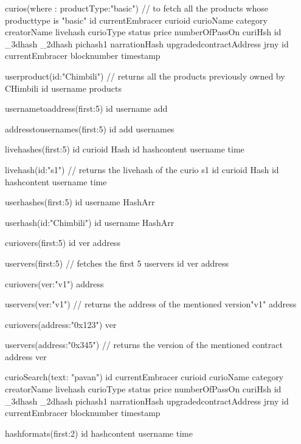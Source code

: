   curios(where : {productType:"basic"}){     // to fetch all the products whose producttype is "basic"
    id
  	currentEmbracer
  	curioid
  	curioName
  	category
  	creatorName
  	livehash
  	curioType
  	status
  	price
  	numberOfPassOn
  	curiHsh {
  	  id
	  _3dhash
	  _2dhash
	  pichash1
	  narrationHash
  	}
  	upgradedcontractAddress
  	jrny{
      id
	  currentEmbracer
	  blocknumber
	  timestamp
    }
  }
  
  userproduct(id:"Chimbili"){   // returns all the products previously owned by CHimbili
	id
	username
	products
  }
  
  usernametoaddress(first:5){
	id
	username
	add
  }
  
  addresstousernames(first:5){
	id
	add
	usernames
  }
  
  livehashes(first:5){  
	id
	curioid
	Hash {
	 id
	 hashcontent
	 username
	 time
	}
  }
  
  
  livehash(id:"s1"){   // returns the livehash of the curio s1
	id
	curioid
	Hash {
	 id
	 hashcontent
	 username
	 time
	}
  }
  
  
  userhashes(first:5){
	id
    username
    HashArr
  }
  
  userhash(id:"Chimbili"){
	id
    username
    HashArr
  }
  
  curiovers(first:5){  
   id
   ver
   address
  }
  
  uservers(first:5){  // fetches the first 5 uservers
   id
   ver
   address
  }
  
  curiovers(ver:"v1"){  
   address
  }
  
  uservers(ver:"v1"){  // returns the address of the mentioned version"v1"
   address
  }
  
  curiovers(address:"0x123"){  
   ver
  }
  
  uservers(address:"0x345"){  // returns the version of the mentioned contract address
   ver
  }
  
  curioSearch(text: "pavan") {
    id
  	currentEmbracer
  	curioid
  	curioName
  	category
  	creatorName
  	livehash
  	curioType
  	status
  	price
  	numberOfPassOn
  	curiHsh {
  	  id
	  _3dhash
	  _2dhash
	  pichash1
	  narrationHash
  	}
  	upgradedcontractAddress
  	jrny{
      id
	  currentEmbracer
	  blocknumber
	  timestamp
    }
 }
 
 hashformats(first:2){
  id
  hashcontent
  username
  time
  }
